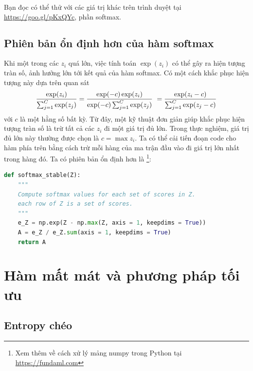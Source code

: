 Bạn đọc có thể thử với các giá trị khác trên trình duyệt tại
\url{https://goo.gl/pKxQYc}, phần softmax.


\subsection{Phiên bản ổn định hơn của hàm softmax}
Khi một trong các $z_i$ quá lớn, việc tính toán $\exp(z_i)$ có thể gây ra hiện
tượng tràn số, ảnh hưởng lớn tới kết quả của hàm
softmax. Có một cách khắc phục hiện tượng này dựa trên quan sát
\begin{equation}
\frac{\exp(z_i)}{\sum_{j=1}^C \exp(z_j)} = \frac{\exp(-c)\exp(z_i)}{\exp(-c)\sum_{j=1}^C \exp(z_j)}\\\
= \frac{\exp(z_i-c)}{\sum_{j=1}^C \exp(z_j-c)}
\end{equation}
với $c$ là một hằng số bất kỳ. Từ đây, một kỹ thuật đơn giản giúp khắc phục hiện
tượng tràn số là trừ tất cả các $z_i$ đi một giá trị đủ lớn. Trong thực nghiệm,
giá trị đủ lớn này thường được chọn là $c = \max z_i$. Ta có thể cải tiến
đoạn code cho hàm \pythoninline{softmax} phía trên bằng cách trừ mỗi hàng của
ma trận đầu vào \pythoninline{Z} đi giá trị lớn nhất trong hàng đó. Ta có phiên
bản ổn định hơn là \pythoninline{softmax_stable}\footnote{Xem thêm về
cách xử lý mảng numpy trong Python tại \url{https://fundaml.com}}:
\begin{lstlisting}[language=Python]
def softmax_stable(Z):
    """
    Compute softmax values for each set of scores in Z.
    each row of Z is a set of scores.
    """
    e_Z = np.exp(Z - np.max(Z, axis = 1, keepdims = True))
    A = e_Z / e_Z.sum(axis = 1, keepdims = True)
    return A
\end{lstlisting}






\section{Hàm mất mát và phương pháp tối ưu }


\subsection{Entropy chéo}

